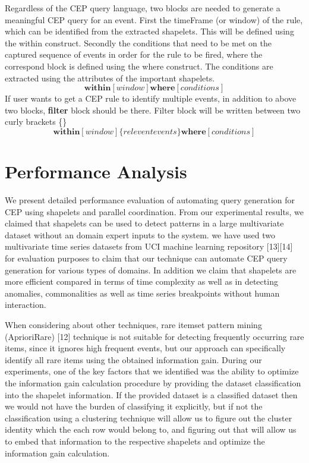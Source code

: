 \documentclass[letterpaper, 10 pt, conference]{IEEEtran}  %
\begin{document}
Regardless of the CEP query language, two blocks are needed to generate a meaningful CEP query for an event. First the timeFrame (or window) of the rule, which can be identified from the extracted shapelets. This will be defined using the within construct. Secondly the conditions that need to be met on the captured sequence of events in order for the rule to be fired, where the correspond block is defined using the where construct. The conditions are extracted using the attributes of the important shapelets.
\begin{equation}
\textbf{within}[window] \textbf{where}[conditions]
\end{equation}
If user wants to get a CEP rule to identify multiple events, in addition to above two blocks, \textbf{filter} block should be there. Filter block will be written between two curly brackets \{\}
\begin{equation}
\textbf{within}[window] \{relevent events\} \textbf{where}[conditions]
\end{equation}


\section{Performance Analysis}
We present detailed performance evaluation of automating query generation for CEP using shapelets and parallel coordination. From our experimental results, we claimed that shapelets can be used to detect patterns in a large multivariate dataset without an domain expert inputs to the system. we have used two multivariate time series datasets from UCI machine learning repository [13][14] for evaluation purposes to claim that our technique can automate CEP query generation for various types of domains. In addition we claim that shapelets are more efficient compared in terms of time complexity as well as in detecting anomalies, commonalities as well as time series breakpoints without human interaction.

When considering about other techniques, rare itemset pattern mining (AprioriRare) [12] technique is not suitable for detecting frequently occurring rare items, since it ignores high frequent events, but our approach can specifically identify all rare items using the obtained information gain. During our experiments, one of the key factors that we identified was the ability to optimize the information gain calculation procedure by providing the dataset classification into the shapelet information. If the provided dataset is a classified dataset then we would not have the burden of classifying it explicitly, but if not the classification using a clustering technique will allow us to figure out the cluster identity which the each row would belong to, and figuring out that will allow us to embed that information to the respective shapelets and optimize the information gain calculation. 
\end{document}

